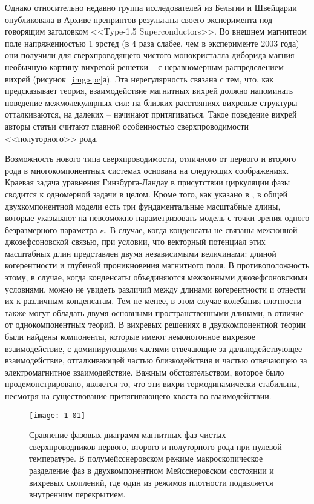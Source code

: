 Однако относительно недавно группа исследователей из Бельгии и Швейцарии 
опубликовала в Архиве препринтов результаты своего эксперимента под говорящим 
заголовком <<Type-1.5 Superconductors>>. Во внешнем магнитном поле 
напряженностью 1 эрстед (в 4 раза слабее, чем в эксперименте 2003 года) они 
получили для сверхпроводящего чистого монокристалла диборида магния необычную 
картину вихревой решетки -- с неравномерным распределением вихрей 
(рисунок~\ref{img:spc}а). Эта нерегулярность связана с тем, что, как 
предсказывает теория, взаимодействие магнитных вихрей должно напоминать 
поведение межмолекулярных сил: на близких расстояниях вихревые структуры 
отталкиваются, на далеких -- начинают притягиваться. Такое поведение вихрей 
авторы статьи считают главной особенностью сверхпроводимости <<полуторного>> 
рода. \cite{bib:superconductors}

Возможность нового типа сверхпроводимости, отличного от первого и второго рода 
в многокомпонентных системах \cite{bib:1,bib:2} основана на следующих 
соображениях. Краевая задача уравнения Гинзбурга-Ландау в присутствии 
циркуляции фазы сводится к одномерной задачи в целом. Кроме того, как указано в 
\cite{bib:1,bib:2}, в общей двухкомпонентной модели есть три фундаментальные 
масштабные длины, которые указывают на невозможно параметризовать модель с 
точки зрения одного безразмерного параметра \( \kappa \). В случае, когда 
конденсаты не связаны межзонной джозефсоновской связью, при условии, что 
векторный потенциал этих масштабных длин представлен двумя независимыми 
величинами: длиной когерентности и глубиной проникновения магнитного поля. В 
противоположность этому, в случае, когда конденсаты объединяются межзонными 
джозефсоновскими условиями, можно не увидеть различий между длинами 
когерентности и отнести их к различным конденсатам. Тем не менее, в этом 
случае колебания плотности также могут обладать двумя основными 
пространственными длинами\cite{bib:2}, в отличие от однокомпонентных теорий. 
В \cite{bib:1,bib:2} вихревых решениях в двухкомпонентной теории были найдены 
компоненты, которые имеют немонотонное вихревое взаимодействие, с 
доминирующими частями отвечающие за дальнодействующее взаимодействие, 
отталкивающей частью близкодействия и частью отвечающею за электромагнитное 
взаимодействие. Важным обстоятельством, которое было продемонстрировано, 
является то, что эти вихри термодинамически стабильны, несмотря на 
существование притягивающего хвоста во взаимодействии.

\begin{figure}[h!]
    \center
    \texttt{[image: 1-01]}
    \caption{Сравнение фазовых диаграмм магнитных фаз чистых сверхпроводников
        первого, второго и полуторного рода при нулевой температуре. В 
        полумейсснеровском режиме макроскопическое разделение фаз в 
        двухкомпонентном Мейсснеровском состоянии и вихревых скоплений, где 
        один из режимов плотности подавляется внутренним перекрытием.}
    \label{fig:1}
\end{figure}

